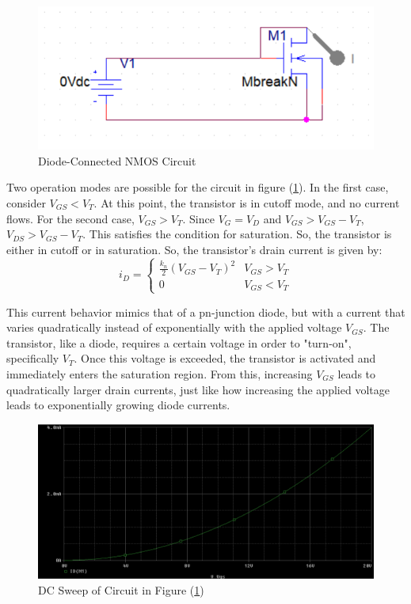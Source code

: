 \FloatBarrier

\begin{figure}[h!]
	\centering
	\includegraphics[scale=0.75]{./images/circuit3.PNG}
	\caption{Diode-Connected NMOS Circuit}
	\label{fig:circuit3}
\end{figure}

\FloatBarrier

Two operation modes are possible for the circuit in figure (\ref{fig:circuit3}). In the first case, consider $V_{GS} < V_{T}$. At this point, the transistor is in cutoff mode, and no current flows. For the second case, $V_{GS} > V_{T}$. Since $V_{G} = V_{D}$ and $V_{GS} > V_{GS} - V_{T}$, $V_{DS} > V_{GS} - V_{T}$. This satisfies the condition for saturation. So, the transistor is either in cutoff or in saturation. So, the transistor's drain current is given by: \\

\begin{equation}
	\label{eq:diode_drain_current}
	i_{D} =
	\begin{cases}
		\frac{k_n}{2} ( V_{GS} - V_{T} )^2 & V_{GS} > V_{T} \\
		0 & V_{GS} < V_{T}
	\end{cases}
\end{equation}

This current behavior mimics that of a pn-junction diode, but with a current that varies quadratically instead of exponentially with the applied voltage $V_{GS}$. The transistor, like a diode, requires a certain voltage in order to "turn-on", specifically $V_{T}$. Once this voltage is exceeded, the transistor is activated and immediately enters the saturation region. From this, increasing $V_{GS}$ leads to quadratically larger drain currents, just like how increasing the applied voltage leads to exponentially growing diode currents.

\FloatBarrier

\begin{figure}[h!]
	\centering
	\includegraphics[scale=0.50]{./images/circuit3_dc_sweep.PNG}
	\caption{DC Sweep of Circuit in Figure (\ref{fig:circuit3})}
	\label{fig:circuit3_dc_sweep}
\end{figure}

\FloatBarrier
